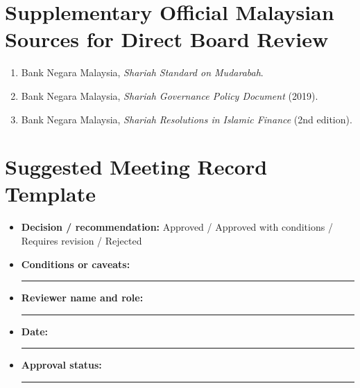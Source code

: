 \documentclass[11pt]{article}
\begin{document}
\section*{Supplementary Official Malaysian Sources for Direct Board Review}

\begin{enumerate}[leftmargin=1.8em]
    \item Bank Negara Malaysia, \emph{Shariah Standard on Mudarabah}.
    \item Bank Negara Malaysia, \emph{Shariah Governance Policy Document} (2019).
    \item Bank Negara Malaysia, \emph{Shariah Resolutions in Islamic Finance} (2nd edition).
\end{enumerate}

\section*{Suggested Meeting Record Template}

\begin{itemize}[leftmargin=1.5em]
    \item \textbf{Decision / recommendation:} Approved / Approved with conditions / Requires revision / Rejected
    \item \textbf{Conditions or caveats:} \rule{4.5in}{0.4pt}
    \item \textbf{Reviewer name and role:} \rule{3.5in}{0.4pt}
    \item \textbf{Date:} \rule{1.5in}{0.4pt}
    \item \textbf{Approval status:} \rule{2in}{0.4pt}
\end{itemize}
\end{document}
